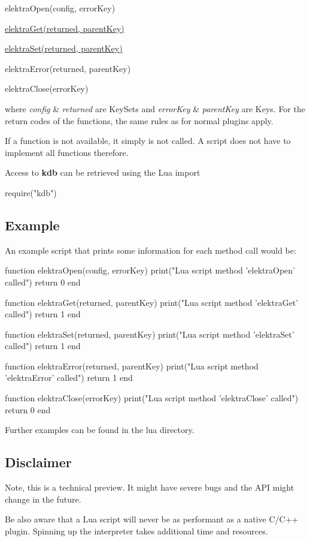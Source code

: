 \begin{DoxyItemize}
\item elektra\+Open(config, error\+Key)
\item \hyperlink{group__highlevel_ga69744067c03e64559504d0c7bea63194}{elektra\+Get(returned, parent\+Key)}
\item \hyperlink{group__highlevel_ga225f1feba939f476b26957a8ac6a5a90}{elektra\+Set(returned, parent\+Key)}
\item elektra\+Error(returned, parent\+Key)
\item elektra\+Close(error\+Key)
\end{DoxyItemize}

where {\itshape config} \& {\itshape returned} are Key\+Sets and {\itshape error\+Key} \& {\itshape parent\+Key} are Keys. For the return codes of the functions, the same rules as for normal plugins apply.

If a function is not available, it simply is not called. A script does not have to implement all functions therefore.

Access to {\bfseries kdb} can be retrieved using the Lua import \begin{DoxyVerb}require("kdb")
\end{DoxyVerb}


\subsection*{Example}

An example script that prints some information for each method call would be\+:


\begin{DoxyCode}
function elektraOpen(config, errorKey)
  print("Lua script method 'elektraOpen' called")
  return 0
end

function elektraGet(returned, parentKey)
  print("Lua script method 'elektraGet' called")
  return 1
end

function elektraSet(returned, parentKey)
  print("Lua script method 'elektraSet' called")
  return 1
end

function elektraError(returned, parentKey)
  print("Lua script method 'elektraError' called")
  return 1
end

function elektraClose(errorKey)
  print("Lua script method 'elektraClose' called")
  return 0
end
\end{DoxyCode}


Further examples can be found in the lua directory.

\subsection*{Disclaimer}

Note, this is a technical preview. It might have severe bugs and the A\+PI might change in the future.

Be also aware that a Lua script will never be as performant as a native C/\+C++ plugin. Spinning up the interpreter takes additional time and resources. 